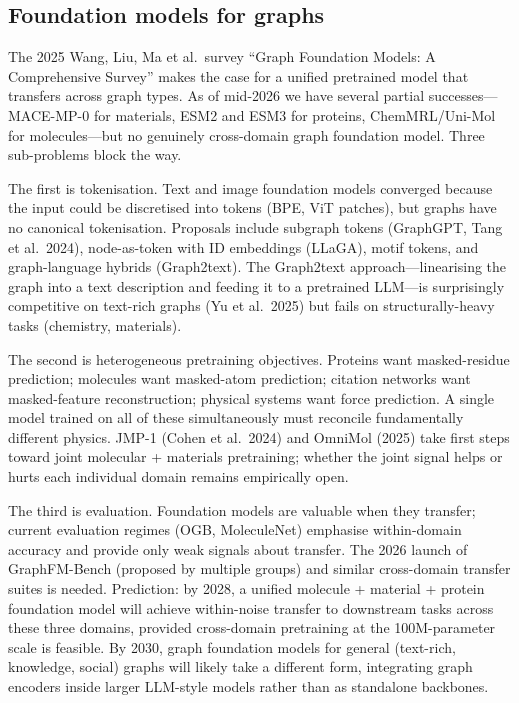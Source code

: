 \documentclass{article}
\begin{document}
\subsection{Foundation models for graphs}\label{foundation-models-for-graphs}

The 2025 Wang, Liu, Ma et al.~survey ``Graph Foundation Models: A Comprehensive Survey'' makes the case for a unified pretrained model that transfers across graph types. As of mid-2026 we have several partial successes---MACE-MP-0 for materials, ESM2 and ESM3 for proteins, ChemMRL/Uni-Mol for molecules---but no genuinely cross-domain graph foundation model. Three sub-problems block the way.

The first is tokenisation. Text and image foundation models converged because the input could be discretised into tokens (BPE, ViT patches), but graphs have no canonical tokenisation. Proposals include subgraph tokens (GraphGPT, Tang et al.~2024), node-as-token with ID embeddings (LLaGA), motif tokens, and graph-language hybrids (Graph2text). The Graph2text approach---linearising the graph into a text description and feeding it to a pretrained LLM---is surprisingly competitive on text-rich graphs (Yu et al.~2025) but fails on structurally-heavy tasks (chemistry, materials).

The second is heterogeneous pretraining objectives. Proteins want masked-residue prediction; molecules want masked-atom prediction; citation networks want masked-feature reconstruction; physical systems want force prediction. A single model trained on all of these simultaneously must reconcile fundamentally different physics. JMP-1 (Cohen et al.~2024) and OmniMol (2025) take first steps toward joint molecular + materials pretraining; whether the joint signal helps or hurts each individual domain remains empirically open.

The third is evaluation. Foundation models are valuable when they transfer; current evaluation regimes (OGB, MoleculeNet) emphasise within-domain accuracy and provide only weak signals about transfer. The 2026 launch of GraphFM-Bench (proposed by multiple groups) and similar cross-domain transfer suites is needed. Prediction: by 2028, a unified molecule + material + protein foundation model will achieve within-noise transfer to downstream tasks across these three domains, provided cross-domain pretraining at the 100M-parameter scale is feasible. By 2030, graph foundation models for general (text-rich, knowledge, social) graphs will likely take a different form, integrating graph encoders inside larger LLM-style models rather than as standalone backbones.
\end{document}
